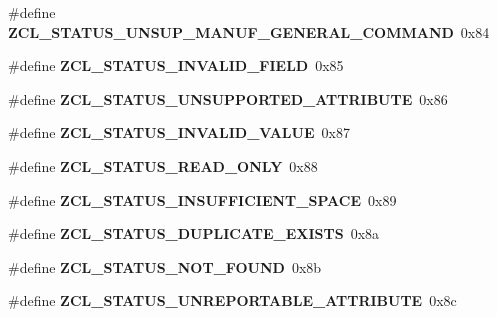 \begin{DoxyCompactItemize}
\item 
\hypertarget{group__zcl_ga8fcbd022ad41842b88587e0e3e8a9e04}{\#define {\bfseries Z\-C\-L\-\_\-\-S\-T\-A\-T\-U\-S\-\_\-\-U\-N\-S\-U\-P\-\_\-\-M\-A\-N\-U\-F\-\_\-\-G\-E\-N\-E\-R\-A\-L\-\_\-\-C\-O\-M\-M\-A\-N\-D}~0x84}\label{group__zcl_ga8fcbd022ad41842b88587e0e3e8a9e04}

\item 
\hypertarget{group__zcl_ga425702cf3f34e360da8c9acff16c40e1}{\#define {\bfseries Z\-C\-L\-\_\-\-S\-T\-A\-T\-U\-S\-\_\-\-I\-N\-V\-A\-L\-I\-D\-\_\-\-F\-I\-E\-L\-D}~0x85}\label{group__zcl_ga425702cf3f34e360da8c9acff16c40e1}

\item 
\hypertarget{group__zcl_gaa6537cd123db9c7bd0fc1e6dd266a87c}{\#define {\bfseries Z\-C\-L\-\_\-\-S\-T\-A\-T\-U\-S\-\_\-\-U\-N\-S\-U\-P\-P\-O\-R\-T\-E\-D\-\_\-\-A\-T\-T\-R\-I\-B\-U\-T\-E}~0x86}\label{group__zcl_gaa6537cd123db9c7bd0fc1e6dd266a87c}

\item 
\hypertarget{group__zcl_ga3bcdd6dde9bfb34db2f3128bd24c71c0}{\#define {\bfseries Z\-C\-L\-\_\-\-S\-T\-A\-T\-U\-S\-\_\-\-I\-N\-V\-A\-L\-I\-D\-\_\-\-V\-A\-L\-U\-E}~0x87}\label{group__zcl_ga3bcdd6dde9bfb34db2f3128bd24c71c0}

\item 
\hypertarget{group__zcl_ga2f7d3dfd56cab3ea207adf13eb749d9b}{\#define {\bfseries Z\-C\-L\-\_\-\-S\-T\-A\-T\-U\-S\-\_\-\-R\-E\-A\-D\-\_\-\-O\-N\-L\-Y}~0x88}\label{group__zcl_ga2f7d3dfd56cab3ea207adf13eb749d9b}

\item 
\hypertarget{group__zcl_ga705d2bc0eb7e564ea9da16181f99a0db}{\#define {\bfseries Z\-C\-L\-\_\-\-S\-T\-A\-T\-U\-S\-\_\-\-I\-N\-S\-U\-F\-F\-I\-C\-I\-E\-N\-T\-\_\-\-S\-P\-A\-C\-E}~0x89}\label{group__zcl_ga705d2bc0eb7e564ea9da16181f99a0db}

\item 
\hypertarget{group__zcl_ga1546fae37fa7e173f23019ea26756bbe}{\#define {\bfseries Z\-C\-L\-\_\-\-S\-T\-A\-T\-U\-S\-\_\-\-D\-U\-P\-L\-I\-C\-A\-T\-E\-\_\-\-E\-X\-I\-S\-T\-S}~0x8a}\label{group__zcl_ga1546fae37fa7e173f23019ea26756bbe}

\item 
\hypertarget{group__zcl_gaed9246e31c0878bdf0806ae5f35ffff7}{\#define {\bfseries Z\-C\-L\-\_\-\-S\-T\-A\-T\-U\-S\-\_\-\-N\-O\-T\-\_\-\-F\-O\-U\-N\-D}~0x8b}\label{group__zcl_gaed9246e31c0878bdf0806ae5f35ffff7}

\item 
\hypertarget{group__zcl_gacaff54a5d8b766e546eb451cfc803fa4}{\#define {\bfseries Z\-C\-L\-\_\-\-S\-T\-A\-T\-U\-S\-\_\-\-U\-N\-R\-E\-P\-O\-R\-T\-A\-B\-L\-E\-\_\-\-A\-T\-T\-R\-I\-B\-U\-T\-E}~0x8c}\label{group__zcl_gacaff54a5d8b766e546eb451cfc803fa4}


\end{DoxyCompactItemize}

